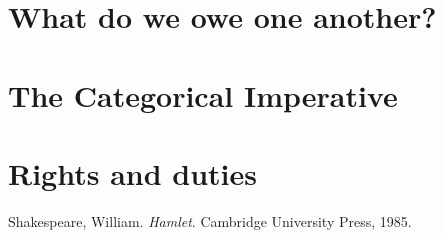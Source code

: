 \documentclass[justified]{tufte-book}
\begin{document}
\hypertarget{what-do-we-owe-one-another}{%
\section{What do we owe one another?}\label{what-do-we-owe-one-another}}

\hypertarget{the-categorical-imperative}{%
\section{The Categorical Imperative}\label{the-categorical-imperative}}

\hypertarget{rights-and-duties}{%
\section{Rights and duties}\label{rights-and-duties}}

\hypertarget{refs}{}
\leavevmode\hypertarget{ref-shakespeareHamlet1985}{}%
Shakespeare, William. \emph{Hamlet}. Cambridge University Press, 1985.
\end{document}
